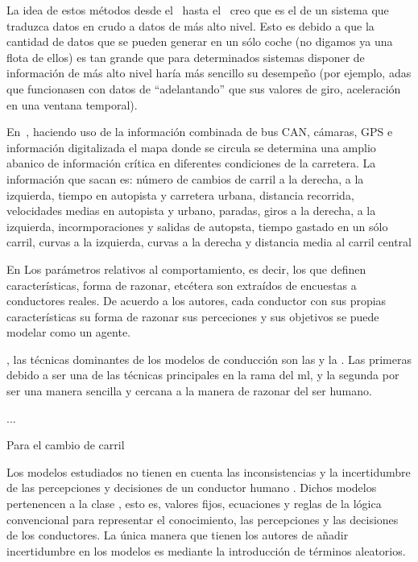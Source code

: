 La idea de estos métodos desde el~\cite{sekizawa2007modeling} hasta el~\cite{bender2015unsupervised} creo que es el de un sistema que traduzca datos en crudo a datos de más alto nivel. Esto es debido a que la cantidad de datos que se pueden generar en un sólo coche (no digamos ya una flota de ellos) es tan grande que para determinados sistemas disponer de información de más alto nivel haría más sencillo su desempeño (por ejemplo, \gls{adas} que funcionasen con datos de \enquote{adelantando} que sus valores de giro, aceleración en una ventana temporal).

En~\cite{satzoda2013towards}, haciendo uso de la información combinada de bus CAN, cámaras, GPS e información digitalizada el mapa donde se circula se determina una amplio abanico de información crítica en diferentes condiciones de la carretera. La información que sacan es: número de cambios de carril a la derecha, a la izquierda, tiempo en autopista y carretera urbana, distancia recorrida, velocidades medias en autopista y urbano, paradas, giros a la derecha, a la izquierda, incormporaciones y salidas de autopsta, tiempo gastado en un sólo carril, curvas a la izquierda, curvas a la derecha y distancia media al carril central


\newthought{}

En \cite{Dia2002} Los parámetros relativos al comportamiento, es decir, los que definen características, forma de razonar, etcétera son extraídos de encuestas a conductores reales. De acuerdo a los autores, cada conductor con sus propias características su forma de razonar sus perceciones y sus objetivos se puede modelar como un agente.

, las técnicas dominantes de los modelos de conducción son las  y la . Las primeras debido a ser una de las técnicas principales en la rama del \gls{ml}, y la segunda por ser una manera sencilla y cercana a la manera de razonar del ser humano.

...

Para el cambio de carril

Los modelos estudiados no tienen en cuenta las inconsistencias y la incertidumbre de las percepciones y decisiones de un conductor humano \cite{McDonald1997}. Dichos modelos pertenencen a la clase , esto es, valores fijos, ecuaciones y reglas de la lógica convencional para representar el conocimiento, las percepciones y las decisiones de los conductores. La única manera que tienen los autores de añadir incertidumbre en los modelos es mediante la introducción de términos aleatorios.

